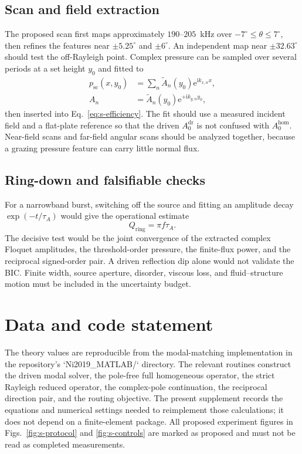 \documentclass[aps,prl,reprint,superscriptaddress,nofootinbib,floatfix]{revtex4-2}
\newcommand{\ii}{\mathrm{i}}
\newcommand{\e}{\mathrm{e}}
\providecommand{\dr}{\mathrm{dr}}
\providecommand{\hom}{\mathrm{hom}}
\begin{document}
\subsection{Scan and field extraction}
\label{sec:s-scan}

The proposed scan first maps approximately $190$--$205$~kHz over
$-7^{\circ}\leq\theta\leq7^{\circ}$, then refines the features near
$\pm5.25^{\circ}$ and $\pm6^{\circ}$.  An independent map near
$\pm32.63^{\circ}$ should test the off-Rayleigh point.  Complex pressure can
be sampled over several periods at a set height $y_0$ and fitted to
\begin{equation}
\begin{aligned}
 p_{\mathrm{sc}}(x,y_0)&=\sum_n \widetilde A_n(y_0)\e^{\ii k_{x,n}x},\\
 A_n&=\widetilde A_n(y_0)\e^{+\ii k_{y,n}y_0},
\end{aligned}
 \label{eq:s-field-fit}
\end{equation}
then inserted into Eq.~\eqref{eq:s-efficiency}.  The fit should use a measured
incident field and a flat-plate reference so that the driven $A_0^{\dr}$ is
not confused with $A_0^{\hom}$.  Near-field scans and far-field angular scans
should be analyzed together, because a grazing pressure feature can carry
little normal flux.

\subsection{Ring-down and falsifiable checks}
\label{sec:s-ringdown}

For a narrowband burst, switching off the source and fitting an amplitude decay
$\exp(-t/\tau_A)$ would give the operational estimate
\begin{equation}
 Q_{\mathrm{ring}}=\pi f\tau_A .
 \label{eq:s-ringdown}
\end{equation}
The decisive test would be the joint convergence of the extracted complex
Floquet amplitudes, the threshold-order pressure, the finite-flux power, and
the reciprocal signed-order pair.  A driven reflection dip alone would not
validate the BIC.  Finite width, source aperture, disorder, viscous loss, and
fluid--structure motion must be included in the uncertainty budget.

\section{Data and code statement}
\label{sec:s-code}

The theory values are reproducible from the modal-matching implementation in
the repository's `Ni2019\_MATLAB/` directory.  The relevant routines construct
the driven modal solver, the pole-free full homogeneous operator, the strict
Rayleigh reduced operator, the complex-pole continuation, the reciprocal
direction pair, and the routing objective.  The present supplement records the
equations and numerical settings needed to reimplement those calculations; it
does not depend on a finite-element package.  All proposed experiment figures
in Figs.~\ref{fig:s-protocol} and \ref{fig:s-controls} are marked as proposed
and must not be read as completed measurements.
\end{document}
